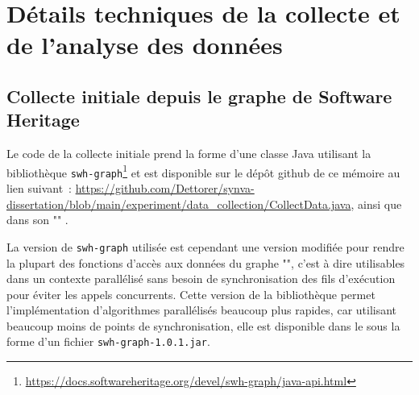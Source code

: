 
\chapter{Détails techniques de la collecte et de l'analyse des données}

\section{Collecte initiale depuis le graphe de Software Heritage}
\label{app:collect.java}

Le code de la collecte initiale prend la forme d'une classe Java utilisant la bibliothèque
\texttt{swh-graph}\footnote{\url{https://docs.softwareheritage.org/devel/swh-graph/java-api.html}} et est
disponible sur le dépôt \gls{github} de ce mémoire au lien suivant :
\url{https://github.com/Dettorer/synva-dissertation/blob/main/experiment/data_collection/CollectData.java},
ainsi que dans son "" \parencite{replication-package}.

La version de \texttt{swh-graph} utilisée est cependant une version modifiée pour rendre la plupart des
fonctions d'accès aux données du graphe "", c'est à dire utilisables dans un contexte
parallélisé sans besoin de synchronisation des fils d'exécution pour éviter les appels concurrents. Cette
version de la bibliothèque permet l'implémentation d'algorithmes parallélisés beaucoup plus rapides, car
utilisant beaucoup moins de points de synchronisation, elle est disponible dans le 
sous la forme d'un fichier \texttt{swh-graph-1.0.1.jar}.

